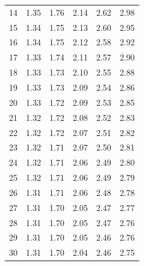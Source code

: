 \begin{center}
\begin{tabular}{r | rrr rr}
14  &  {\normalsize  1.35} & {\normalsize  1.76} & {\normalsize  2.14} & {\normalsize  2.62} & {\normalsize  2.98}  \\ 
15  &  {\normalsize  1.34} & {\normalsize  1.75} & {\normalsize  2.13} & {\normalsize  2.60} & {\normalsize  2.95}  \\ 
\hline
16  &  {\normalsize  1.34} & {\normalsize  1.75} & {\normalsize  2.12} & {\normalsize  2.58} & {\normalsize  2.92}  \\ 
17  &  {\normalsize  1.33} & {\normalsize  1.74} & {\normalsize  2.11} & {\normalsize  2.57} & {\normalsize  2.90}  \\ 
18  &  {\normalsize  1.33} & {\normalsize  1.73} & {\normalsize  2.10} & {\normalsize  2.55} & {\normalsize  2.88}  \\ 
19  &  {\normalsize  1.33} & {\normalsize  1.73} & {\normalsize  2.09} & {\normalsize  2.54} & {\normalsize  2.86}  \\ 
20  &  {\normalsize  1.33} & {\normalsize  1.72} & {\normalsize  2.09} & {\normalsize  2.53} & {\normalsize  2.85}  \\ 
\hline
\hline
21  &  {\normalsize  1.32} & {\normalsize  1.72} & {\normalsize  2.08} & {\normalsize  2.52} & {\normalsize  2.83}  \\ 
22  &  {\normalsize  1.32} & {\normalsize  1.72} & {\normalsize  2.07} & {\normalsize  2.51} & {\normalsize  2.82}  \\ 
23  &  {\normalsize  1.32} & {\normalsize  1.71} & {\normalsize  2.07} & {\normalsize  2.50} & {\normalsize  2.81}  \\ 
24  &  {\normalsize  1.32} & {\normalsize  1.71} & {\normalsize  2.06} & {\normalsize  2.49} & {\normalsize  2.80}  \\ 
25  &  {\normalsize  1.32} & {\normalsize  1.71} & {\normalsize  2.06} & {\normalsize  2.49} & {\normalsize  2.79}  \\ 
\hline
26  &  {\normalsize  1.31} & {\normalsize  1.71} & {\normalsize  2.06} & {\normalsize  2.48} & {\normalsize  2.78}  \\ 
27  &  {\normalsize  1.31} & {\normalsize  1.70} & {\normalsize  2.05} & {\normalsize  2.47} & {\normalsize  2.77}  \\ 
28  &  {\normalsize  1.31} & {\normalsize  1.70} & {\normalsize  2.05} & {\normalsize  2.47} & {\normalsize  2.76}  \\ 
29  &  {\normalsize  1.31} & {\normalsize  1.70} & {\normalsize  2.05} & {\normalsize  2.46} & {\normalsize  2.76}  \\ 
30  &  {\normalsize  1.31} & {\normalsize  1.70} & {\normalsize  2.04} & {\normalsize  2.46} & {\normalsize  2.75}  \\ 
\hline
\end{tabular}
\label{tTableFirstPage}
\end{center}


